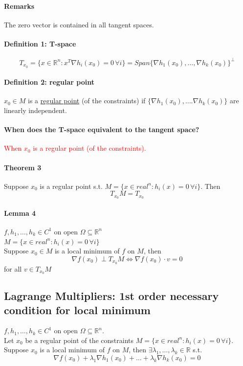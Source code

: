 \documentclass[11pt]{article}
\newcommand{\real}[0]{\mathbb{R}}
\newcommand{\under}[1]{\underline{#1}}
\begin{document}
\paragraph{Remarks}
The zero vector is contained in all tangent spaces.

\paragraph{Definition 1: T-space}
$$T_{x_0} = \{ x\in \real^n: x^T \nabla h_i(x_0) = 0 \, \forall i\} = Span\{ \nabla h_1(x_0), \hdots, \nabla h_k(x_0)\}^\perp$$

\paragraph{Definition 2: regular point}
$x_0 \in M$ is a \under{regular point} (of the constraints) if $\{ \nabla h_1(x_0), \hdots. \nabla h_k(x_0) \}$ are linearly independent.


\paragraph{When does the T-space equivalent to the tangent space?}
\textcolor{red}{When $x_0$ is a regular point (of the constraints).}

\paragraph{Theorem 3}
Suppose $x_0$ is a regular point s.t. $ M = \{ x \in real^n: h_i(x) = 0 \, \forall i\}$. Then
$$T_{x_0}M = T_{x_0}$$

\paragraph{Lemma 4}
$f, h_1, \hdots, h_k \in C^1$ on open $\Omega \subseteq \real^n$ \\
$ M = \{ x \in real^n: h_i(x) = 0 \, \forall i\}$ \\
Suppose $x_0 \in M$ is a local minimum of $f$ on $M$, then
$$\nabla f(x_0) \perp T_{x_0}M \iff \nabla f(x_0)\cdot v = 0$$ for all $v \in T_{x_0}M$

\subsection{Lagrange Multipliers: 1st order necessary condition for local minimum}
$f, h_1, \hdots, h_k \in C^1$ on open $\Omega \subseteq \real^n$. \\
Let $x_0$ be a regular point of the constraints $ M = \{ x \in real^n: h_i(x) = 0 \, \forall i\}$. \\
Suppose $x_0$ is a local minimum of $f$ on $M$, then $\exists \lambda_1, \hdots, \lambda_k \in \real$ s.t.
$$\nabla f(x_0) + \lambda_1 \nabla h_1(x_0) + \hdots + \lambda_k \nabla h_k(x_0) = 0$$
\end{document}
